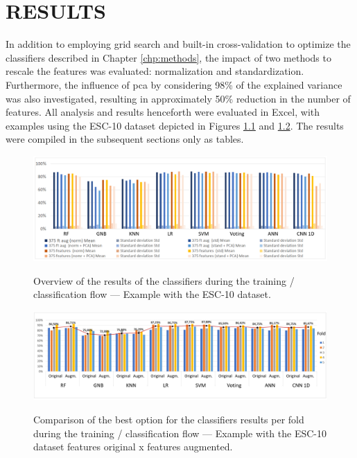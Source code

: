 \chapter{RESULTS}
\label{chp:results}

In addition to employing grid search and built-in cross-validation to optimize the classifiers described in Chapter \ref{chp:methods}, the impact of two methods to rescale the features was evaluated: normalization and standardization. Furthermore, the influence of \gls{pca} by considering 98\% of the explained variance was also investigated, resulting in approximately 50\% reduction in the number of features. All analysis and results henceforth were evaluated in Excel, with examples using the ESC-10 dataset depicted in Figures \ref{fig:results_ESC-10_classification_results_overview} and \ref{fig:results_ESC-10_classification_results_fold_overview}. The results were compiled in the subsequent sections only as tables.

\begin{figure}[htbp]
    \centering
        \caption{Overview of the results of the classifiers during the training / classification flow — Example with the ESC-10 dataset.}
        \includegraphics[width=1\textwidth]{resources/images/060-results/Results_classification_flow_ESC-10_2.png}
        \label{fig:results_ESC-10_classification_results_overview}
\end{figure}

\begin{figure}[htbp]
    \centering
        \caption{Comparison of the best option for the classifiers results per fold during the training / classification flow — Example with the ESC-10 dataset features original x features augmented.}
        \includegraphics[width=.95\textwidth]{resources/images/060-results/Results_classification_flow_ESC-10_1.png}
        \label{fig:results_ESC-10_classification_results_fold_overview}
\end{figure}


